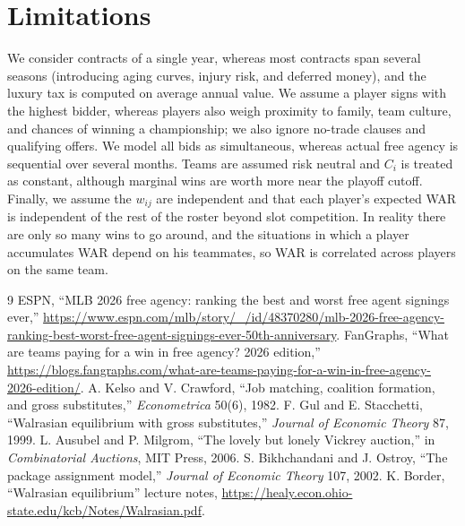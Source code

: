 \documentclass{article}
\begin{document}
\section{Limitations}
We consider contracts of a single year, whereas most contracts span several seasons (introducing aging curves, injury risk, and deferred money), and the luxury tax is computed on average annual value. We assume a player signs with the highest bidder, whereas players also weigh proximity to family, team culture, and chances of winning a championship; we also ignore no-trade clauses and qualifying offers. We model all bids as simultaneous, whereas actual free agency is sequential over several months. Teams are assumed risk neutral and $C_i$ is treated as constant, although marginal wins are worth more near the playoff cutoff. Finally, we assume the $w_{ij}$ are independent and that each player's expected WAR is independent of the rest of the roster beyond slot competition. In reality there are only so many wins to go around, and the situations in which a player accumulates WAR depend on his teammates, so WAR is correlated across players on the same team.

\begin{thebibliography}{9}
 ESPN, ``MLB 2026 free agency: ranking the best and worst free agent signings ever,'' \url{https://www.espn.com/mlb/story/_/id/48370280/mlb-2026-free-agency-ranking-best-worst-free-agent-signings-ever-50th-anniversary}.
 FanGraphs, ``What are teams paying for a win in free agency? 2026 edition,'' \url{https://blogs.fangraphs.com/what-are-teams-paying-for-a-win-in-free-agency-2026-edition/}.
 A. Kelso and V. Crawford, ``Job matching, coalition formation, and gross substitutes,'' \emph{Econometrica} 50(6), 1982.
 F. Gul and E. Stacchetti, ``Walrasian equilibrium with gross substitutes,'' \emph{Journal of Economic Theory} 87, 1999.
 L. Ausubel and P. Milgrom, ``The lovely but lonely Vickrey auction,'' in \emph{Combinatorial Auctions}, MIT Press, 2006.
 S. Bikhchandani and J. Ostroy, ``The package assignment model,'' \emph{Journal of Economic Theory} 107, 2002.
 K. Border, ``Walrasian equilibrium'' lecture notes, \url{https://healy.econ.ohio-state.edu/kcb/Notes/Walrasian.pdf}.
\end{thebibliography}
\end{document}
